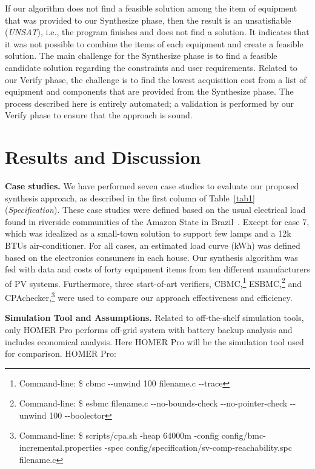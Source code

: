 \documentclass[runningheads]{llncs}
\begin{document}
If our algorithm does not find a feasible solution among the item of equipment that was provided to our {\sc Synthesize} phase, then the result is an unsatisfiable (\textit{UNSAT}), i.e., the program finishes and does not find a solution. It indicates that it was not possible to combine the items of each equipment and create a feasible solution. The main challenge for the {\sc Synthesize} phase is to find a feasible candidate solution regarding the constraints and user requirements. Related to our {\sc Verify} phase, the challenge is to find the lowest acquisition cost from a list of equipment and components that are provided from the {\sc Synthesize} phase. 
The process described here is entirely automated; a validation is performed by our {\sc Verify} phase to ensure that the approach is sound.

\section{Results and Discussion}

\textbf{Case studies.} We have performed seven case studies to evaluate our proposed synthesis approach, as described in the first column of Table~\ref{tab1} 
(\textit{Specification}). These case studies were defined based on the usual electrical load found in riverside communities of the Amazon State in Brazil~\cite{Agrener2013,TrindadeCordeiro19}. Except for case 7, which was idealized as a small-town solution to support few lamps and a 12k BTUs air-conditioner. For all cases, an estimated load curve (kWh) was defined based on the electronics consumers in each house.
%
Our synthesis algorithm was fed with data and costs of forty equipment items from ten different manufacturers of PV systems. Furthermore, three start-of-art verifiers, CBMC,\footnote{Command-line: \$ cbmc -\phantom{}-unwind 100 filename.c -\phantom{}-trace} ESBMC,\footnote{Command-line: \$ esbmc filename.c -\phantom{}-no-bounds-check -\phantom{}-no-pointer-check -\phantom{}-unwind 100 -\phantom{}-boolector} and CPAchecker,\footnote{Command-line: \$ scripts/cpa.sh -heap 64000m -config config/bmc-incremental.properties -spec config/specification/sv-comp-reachability.spc filename.c} were used to compare our approach effectiveness and efficiency. 

\noindent \textbf{Simulation Tool and Assumptions.} Related to off-the-shelf simulation tools, only HOMER Pro performs off-grid system with battery backup analysis and includes economical analysis. Here HOMER Pro will be the simulation tool used for comparison. HOMER Pro:
\end{document}
